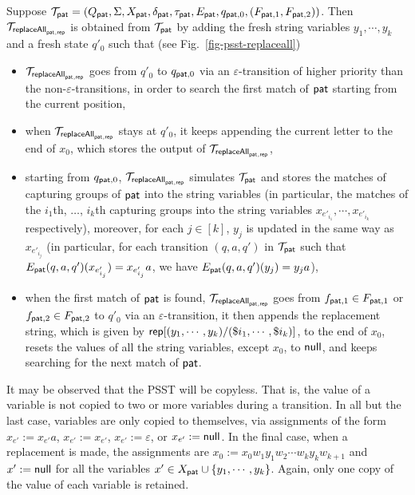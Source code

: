  Suppose $\mathcal{T}_{\mathsf{pat}} = (Q_{\mathsf{pat}}, \Sigma, X_{\mathsf{pat}}, \delta_{\mathsf{pat}}, \tau_{\mathsf{pat}}, E_{\mathsf{pat}}, q_{\mathsf{pat},0}, (F_{\mathsf{pat},1}, F_{\mathsf{pat},2}))$.
Then $\mathcal{T}_{\mathsf{replaceAll}_{\mathsf{pat},\mathsf{rep}}}$ is obtained from $\mathcal{T}_{\mathsf{pat}}$ by adding the fresh string variables $y_1, \cdots, y_k$ and a fresh state $q'_0$ such that (see Fig.~\ref{fig-psst-replaceall})
\begin{itemize}
    \item $\mathcal{T}_{\mathsf{replaceAll}_{\mathsf{pat},\mathsf{rep}}}$ goes from $q'_0$ to $q_{\mathsf{pat},0}$ via an $\varepsilon$-transition of higher priority than the non-$\varepsilon$-transitions, in order to search the first match of $\mathsf{pat}$ starting from the current position,
    \item when $\mathcal{T}_{\mathsf{replaceAll}_{\mathsf{pat},\mathsf{rep}}}$ stays at $q'_0$, it keeps appending the current letter to the end of $x_0$, which stores the output of $\mathcal{T}_{\mathsf{replaceAll}_{\mathsf{pat},\mathsf{rep}}}$,
    \item starting from $q_{\mathsf{pat}, 0}$, $\mathcal{T}_{\mathsf{replaceAll}_{\mathsf{pat},\mathsf{rep}}}$ simulates $\mathcal{T}_{\mathsf{pat}}$ and stores the matches of capturing groups of $\mathsf{pat}$ into the string variables (in particular,
    the matches of the $i_1$th, $\ldots$, $i_k$th capturing groups into the string variables $x_{e'_{i_1}}, \cdots, x_{e'_{i_k}}$ respectively), moreover, for each $j \in [k]$, $y_j$ is updated in the same way as $x_{e'_{i_j}}$ (in particular, for each transition $(q, a, q')$ in $\mathcal{T}_{\mathsf{pat}}$ such that $E_{\mathsf{pat}}(q, a, q')(x_{e'_{i_j}}) = x_{e'_{i_j}} a$,  we have $E_{\mathsf{pat}}(q, a, q')(y_j) = y_j a$),

    \item when the first match of $\mathsf{pat}$ is found, $\mathcal{T}_{\mathsf{replaceAll}_{\mathsf{pat},\mathsf{rep}}}$ goes from $f_{\mathsf{pat},1} \in F_{\mathsf{pat}, 1}$ or $f_{\mathsf{pat}, 2} \in F_{\mathsf{pat}, 2}$ to $q'_0$ via an $\varepsilon$-transition, it then appends the replacement string, which is given by $\mathsf{rep}[(y_1, \cdots, y_k)/(\$i_1,\cdots, \$i_k)]$, to the end of $x_0$, resets the values of all the string variables, except $x_0$, to $\mathsf{null}$, and keeps searching for the next match of $\mathsf{pat}$.
\end{itemize}

It may be observed that the PSST will be copyless.
That is, the value of a variable is not copied to two or more variables during a transition.
In all but the last case, variables are only copied to themselves, via assignments of the form $x_{e'} := x_{e'} a$, $x_{e'} := x_{e'}$, $x_{e'} := \varepsilon$, or $x_{e'} := \mathsf{null}$.
In the final case, when a replacement is made, the assignments are
$x_0 := x_0 w_1y_1 w_2 \cdots w_k y_k w_{k+1}$
and
$x^\prime := \mathsf{null}$ for all the variables $x^\prime \in X_{\mathsf{pat}} \cup \{y_1, \cdots, y_k\}$.
Again, only one copy of the value of each variable is retained.

